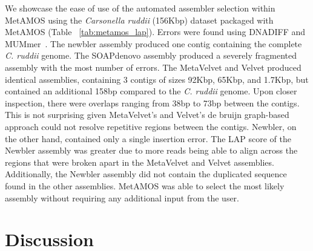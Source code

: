\documentclass[conference]{IEEEtran}
\begin{document}
We showcase the ease of use of the automated assembler selection within MetAMOS using the \emph{Carsonella ruddii} (156Kbp) dataset packaged with MetAMOS (Table ~\ref{tab:metamos_lap}).
Errors were found using DNADIFF and MUMmer~\cite{delcher2003using}.
The newbler assembly produced one contig containing the complete \emph{C. ruddii} genome.
The SOAPdenovo assembly produced a severely fragmented assembly with the most number of errors.
The MetaVelvet and Velvet produced identical assemblies, containing 3 contigs of sizes 92Kbp, 65Kbp, and 1.7Kbp, but contained an additional 158bp compared to the \emph{C. ruddii} genome.
Upon closer inspection, there were overlaps ranging from 38bp to 73bp between the contigs.
This is not surprising given MetaVelvet's and Velvet's de bruijn graph-based approach could not resolve repetitive regions between the contigs.
Newbler, on the other hand, contained only a single insertion error.
The LAP score of the Newbler assembly was greater due to more reads being able to align across the regions that were broken apart in the MetaVelvet and Velvet assemblies.
Additionally, the Newbler assembly did not contain the duplicated sequence found in the other assemblies.
MetAMOS was able to select the most likely assembly without requiring any additional input from the user.

\section{Discussion}
\end{document}
